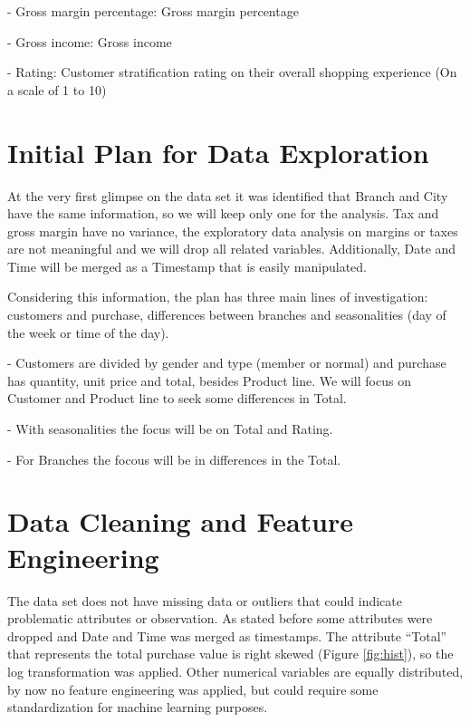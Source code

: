 \documentclass[11pt, a4]{article}
\begin{document}
- Gross margin percentage: Gross margin percentage

- Gross income: Gross income

- Rating: Customer stratification rating on their overall shopping experience (On a scale of 1 to 10)


\section*{Initial Plan for Data Exploration}

At the very first glimpse on the data set it was identified that Branch and City have the same information, so we will keep only one for the analysis. Tax and gross margin have no variance, the exploratory data analysis on margins or taxes are not meaningful and we will drop all related variables. Additionally, Date and Time will be merged as a Timestamp that is easily manipulated. 

Considering this information, the plan has three main lines of investigation: customers and purchase, differences between branches and seasonalities (day of the week or time of the day).

- Customers are divided by gender and type (member or normal) and purchase has quantity, unit price and total, besides Product line. We will focus on Customer and Product line to seek some differences in Total.

- With seasonalities the focus will be on Total and Rating.

- For Branches the focous will be in differences in the Total.
 

\section*{Data Cleaning and Feature Engineering}


The data set does not have missing data or outliers that could indicate problematic attributes or observation. As stated before some attributes were dropped and Date and Time was merged as timestamps. The attribute “Total” that represents the total purchase value is right skewed (Figure \ref{fig:hist}), so the log transformation was applied. Other numerical variables are equally distributed, by now no feature engineering was applied, but could require some standardization for machine learning purposes.
\end{document}
